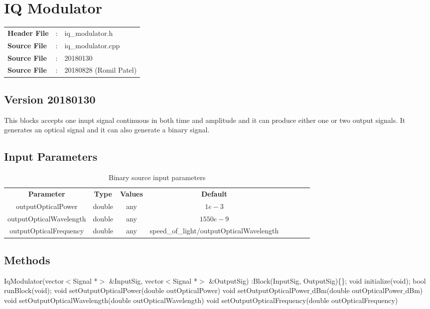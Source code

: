 \clearpage

\section{IQ Modulator}
\begin{refsection}
\begin{tcolorbox}	
	\begin{tabular}{p{2.75cm} p{0.2cm} p{10.5cm}} 	
		\textbf{Header File}   &:& iq\_modulator.h \\
		\textbf{Source File}   &:& iq\_modulator.cpp \\
		\textbf{Source File}   &:& 20180130 \\
		\textbf{Source File}   &:& 20180828 (Romil Patel)\\	
	\end{tabular}
\end{tcolorbox}
\subsection*{Version 20180130}
This blocks accepts one inupt signal continuous in both time and amplitude and it can produce either one or two output signals. It generates an optical signal and it can also generate a binary signal.
\subsection*{Input Parameters}
\begin{table}[h]
	\centering
	\begin{tabular}{|c|c|c|c|cccc}
		\cline{1-4}
		\textbf{Parameter} & \textbf{Type} & \textbf{Values} &   \textbf{Default}& \\ \cline{1-4}
		outputOpticalPower & double & any & $1e-3$ \\ \cline{1-4}
		outputOpticalWavelength & double & any & $1550e-9$ \\ \cline{1-4}
		outputOpticalFrequency & double & any & speed\_of\_light/outputOpticalWavelength \\ \cline{1-4}
	\end{tabular}
	\caption{Binary source input parameters}
	\label{table:iqmod_in_par}
\end{table}
\subsection*{Methods}
IqModulator(vector$<$Signal *$>$ \&InputSig, vector$<$Signal *$>$ \&OutputSig) :Block(InputSig, OutputSig)\{\};
\bigbreak
void initialize(void);
\bigbreak
bool runBlock(void);
\bigbreak
void setOutputOpticalPower(double outOpticalPower)
\bigbreak
void setOutputOpticalPower$\_$dBm(double outOpticalPower$\_$dBm)
\bigbreak
void setOutputOpticalWavelength(double outOpticalWavelength)
\bigbreak
void setOutputOpticalFrequency(double outOpticalFrequency)

\end{refsection}

